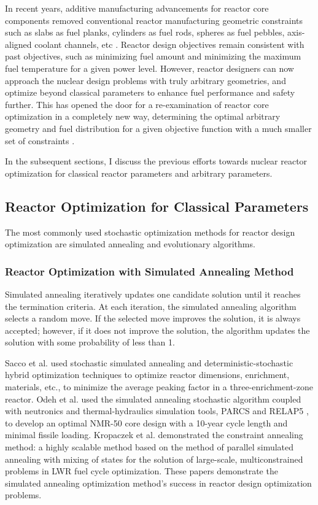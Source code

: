 In recent years, additive manufacturing advancements for reactor core components 
removed conventional reactor manufacturing geometric constraints such as slabs as fuel 
planks, cylinders as fuel rods, spheres as fuel pebbles, axis-aligned coolant 
channels, etc  \cite{sobes_artificial_2020}.
Reactor design objectives remain consistent with past objectives, such as 
minimizing fuel amount and minimizing the maximum fuel temperature for a given 
power level.
However, reactor designers can now approach the nuclear design problems with truly 
arbitrary geometries, and optimize beyond classical parameters to enhance 
fuel performance and safety further. 
This has opened the door for a re-examination of reactor core 
optimization in a completely new way, determining the optimal arbitrary geometry 
and fuel distribution for a given objective function with a much smaller set of 
constraints \cite{sobes_artificial_2020}. 

In the subsequent sections, I discuss the previous efforts towards nuclear 
reactor optimization for classical reactor parameters and arbitrary parameters. 

\subsection{Reactor Optimization for Classical Parameters}
The most commonly used stochastic optimization methods for reactor design 
optimization are simulated annealing and evolutionary algorithms. 

\subsubsection{Reactor Optimization with Simulated Annealing Method}
Simulated annealing iteratively updates one candidate solution until it reaches 
the termination criteria. 
At each iteration, the simulated annealing algorithm selects a random move. 
If the selected move improves the solution, it is always accepted; however,  
if it does not improve the solution, the algorithm updates the solution with 
some probability of less than 1.

Sacco et al. \cite{sacco_two_2006,sacco_metropolis_2008} used stochastic 
simulated annealing and deterministic-stochastic hybrid optimization techniques 
to optimize reactor dimensions, enrichment, materials, etc., to 
minimize the average peaking factor in a three-enrichment-zone reactor. 
Odeh et al. \cite{odeh_core_2016} used the simulated annealing stochastic algorithm 
coupled with neutronics and thermal-hydraulics simulation tools, \gls{PARCS} and RELAP5
\cite{fletcher_relap5mod3_1992}, to develop an optimal \gls{NMR-50} core design 
with a 10-year cycle length and minimal fissile loading. 
Kropaczek et al. \cite{kropaczek_large-scale_2019} demonstrated the constraint 
annealing method: a highly scalable method based on the method of parallel 
simulated annealing with mixing of states \cite{kropaczek_constraint_2019} for 
the solution of large-scale, multiconstrained problems in \gls{LWR} fuel cycle 
optimization. 
These papers demonstrate the simulated annealing optimization method's success in 
reactor design optimization problems. 

